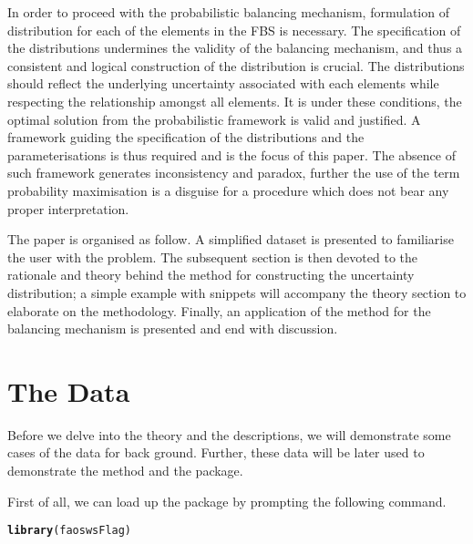 \documentclass[nojss]{jss}\usepackage[]{graphicx}\usepackage[]{color}
\makeatletter
\newcommand{\hlstd}[1]{\textcolor[rgb]{0.345,0.345,0.345}{#1}}%
\newcommand{\hlkwd}[1]{\textcolor[rgb]{0.737,0.353,0.396}{\textbf{#1}}}%
\newenvironment{kframe}{%
 \def\at@end@of@kframe{}%
 \ifinner\ifhmode%
  \def\at@end@of@kframe{\end{minipage}}%
  \begin{minipage}{\columnwidth}%
 \fi\fi%
 \def\FrameCommand##1{\hskip\@totalleftmargin \hskip-\fboxsep
 \colorbox{shadecolor}{##1}\hskip-\fboxsep
     \hskip-\linewidth \hskip-\@totalleftmargin \hskip\columnwidth}%
 \MakeFramed {\advance\hsize-\width
   \@totalleftmargin\z@ \linewidth\hsize
   \@setminipage}}%
 {\par\unskip\endMakeFramed%
 \at@end@of@kframe}
\newenvironment{knitrout}{}{} %
\makeatother
\begin{document}
In order to proceed with the probabilistic balancing mechanism,
formulation of distribution for each of the elements in the FBS is
necessary. The specification of the distributions undermines the
validity of the balancing mechanism, and thus a consistent and logical
construction of the distribution is crucial. The distributions should
reflect the underlying uncertainty associated with each elements while
respecting the relationship amongst all elements. It is under these
conditions, the optimal solution from the probabilistic framework is
valid and justified. A framework guiding the specification of the
distributions and the parameterisations is thus required and is the
focus of this paper. The absence of such framework generates
inconsistency and paradox, further the use of the term probability
maximisation is a disguise for a procedure which does not bear any
proper interpretation.


The paper is organised as follow. A simplified dataset is presented to
familiarise the user with the problem. The subsequent section is then
devoted to the rationale and theory behind the method for constructing
the uncertainty distribution; a simple example with snippets will
accompany the theory section to elaborate on the methodology. Finally,
an application of the method for the balancing mechanism is presented
and end with discussion.




\section{The Data}

Before we delve into the theory and the descriptions, we will
demonstrate some cases of the data for back ground. Further, these
data will be later used to demonstrate the method and the package.


First of all, we can load up the package by prompting the following command.

\begin{knitrout}
\color{fgcolor}\begin{kframe}
\begin{alltt}
\hlkwd{library}\hlstd{(faoswsFlag)}
\end{alltt}
\end{kframe}
\end{knitrout}
\end{document}
